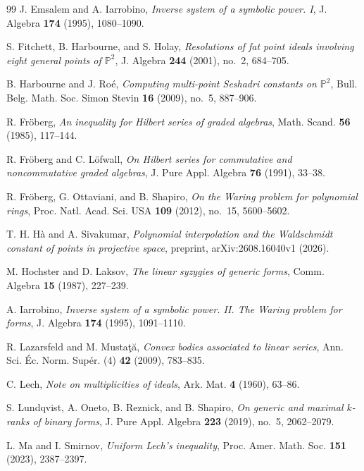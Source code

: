 \documentclass[11pt]{amsart}
\theoremstyle{remark}
\newcommand{\PP}{\mathbb P}
\begin{document}
\begin{thebibliography}{99}
J. Emsalem and A. Iarrobino,
\emph{Inverse system of a symbolic power. I},
J. Algebra \textbf{174} (1995), 1080--1090.



S. Fitchett, B. Harbourne, and S. Holay,
\emph{Resolutions of fat point ideals involving eight general points of $\PP^2$},
J. Algebra \textbf{244} (2001), no.~2, 684--705.

B. Harbourne and J. Ro\'e,
\emph{Computing multi-point Seshadri constants on $\PP^2$},
Bull. Belg. Math. Soc. Simon Stevin \textbf{16} (2009), no.~5, 887--906.

R. Fr\"oberg,
\emph{An inequality for Hilbert series of graded algebras},
Math. Scand. \textbf{56} (1985), 117--144.

R. Fr\"oberg and C. L\"ofwall,
\emph{On Hilbert series for commutative and noncommutative graded algebras},
J. Pure Appl. Algebra \textbf{76} (1991), 33--38.

R. Fr\"oberg, G. Ottaviani, and B. Shapiro,
\emph{On the Waring problem for polynomial rings},
Proc. Natl. Acad. Sci. USA \textbf{109} (2012), no.~15, 5600--5602.

T. H. H\`a and A. Sivakumar,
\emph{Polynomial interpolation and the Waldschmidt constant of points in projective space},
preprint, arXiv:2608.16040v1 (2026).

M. Hochster and D. Laksov,
\emph{The linear syzygies of generic forms},
Comm. Algebra \textbf{15} (1987), 227--239.

A. Iarrobino,
\emph{Inverse system of a symbolic power. II. The Waring problem for forms},
J. Algebra \textbf{174} (1995), 1091--1110.

R. Lazarsfeld and M. Musta\c{t}\u{a},
\emph{Convex bodies associated to linear series},
Ann. Sci. \'Ec. Norm. Sup\'er. (4) \textbf{42} (2009), 783--835.

C. Lech,
\emph{Note on multiplicities of ideals},
Ark. Mat. \textbf{4} (1960), 63--86.


S. Lundqvist, A. Oneto, B. Reznick, and B. Shapiro,
\emph{On generic and maximal $k$-ranks of binary forms},
J. Pure Appl. Algebra \textbf{223} (2019), no.~5, 2062--2079.

L. Ma and I. Smirnov,
\emph{Uniform Lech's inequality},
Proc. Amer. Math. Soc. \textbf{151} (2023), 2387--2397.


\end{thebibliography}
\end{document}
